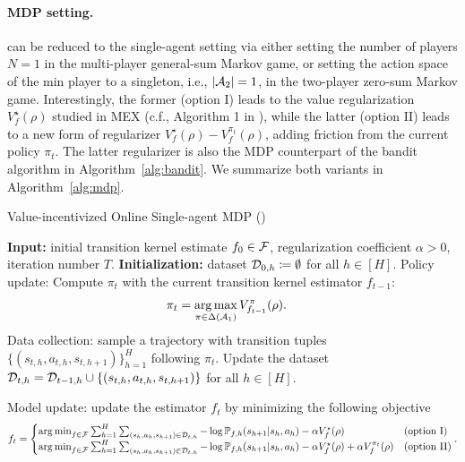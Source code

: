 \paragraph{MDP setting.}  \name can be reduced to the single-agent setting via either setting the number of players $N=1$  in the multi-player general-sum Markov game, or setting the action space of the min player  to a singleton, i.e., $|{\mathcal{A}}_2|=1$, in the two-player zero-sum Markov game. Interestingly, the former (option I) leads to the value regularization $V_{f}^{\star}(\rho)$ studied in MEX (c.f., Algorithm 1 in \citet{liu2024maximize}), while the latter (option II) leads to a new form of regularizer $V_{f}^{\star}(\rho)-V_{f}^{\pi_t}(\rho)$, adding friction from the current policy $\pi_t$. The latter regularizer is also the MDP counterpart of the bandit algorithm in Algorithm~\ref{alg:bandit}. We summarize both variants in Algorithm~\ref{alg:mdp}.


\begin{algorithm}[!ht]
    \caption{Value-incentivized Online Single-agent MDP (\name)}
    \label{alg:mdp}
    \begin{algorithmic}[1]
    \STATE \textbf{Input:}  initial transition kernel estimate $f_0\in{\mathcal{F}}$, regularization coefficient $\alpha>0$, iteration number $T$.  
    \STATE \textbf{Initialization:} dataset ${\mathcal{D}}_{0,h}\coloneqq \emptyset$ for all $h\in[H]$.
    \STATE 
    Policy update: Compute $\pi_t$ with the current transition kernel estimator $f_{t-1}$:
    \begin{align}%
        \pi_t&=\argmax_{\pi\in\Delta(\gA_1)} V^\pi_{f_{t-1}}(\rho).
    \end{align} 
        \STATE Data collection: sample a trajectory with transition tuples $\{(s_{t,h},a_{t,h},s_{t,h+1})\}_{h=1}^H$ following $\pi_t$. Update the dataset ${\mathcal{D}}_{t,h}={\mathcal{D}}_{t-1,h}\cup\left\{ (s_{t,h},a_{t,h},s_{t,h+1}) \right\}$ for all $h\in[H]$.
   
 
    \STATE Model update: update the estimator $f_t$ by minimizing the following objective
        \begin{align}%
    f_t=   \begin{cases} 
    \argmin_{f\in\gF}\sum_{h=1}^H\sum_{(s_h,a_h,s_{h+1})\in\gD_{t,h}}-\log \PP_{f,h}(s_{h+1}|s_h,a_h) -\alpha V_f^\star(\rho)  &  \text{(option I)} \\
    \argmin_{f\in\gF}\sum_{h=1}^H\sum_{(s_h,a_h,s_{h+1})\in\gD_{t,h}}-\log \PP_{f,h}(s_{h+1}|s_h,a_h) -\alpha V_f^\star(\rho)+\alpha V_{f}^{\pi_t}(\rho) & \text{(option II)} 
    \end{cases}
     .
    \end{align}
 
    \ENDFOR 
    \end{algorithmic}
\end{algorithm}

